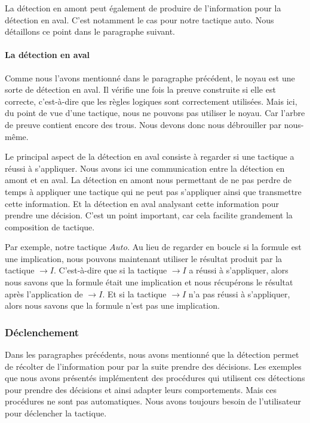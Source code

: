 \documentclass[french,titlepage]{article}
\begin{document}
La détection en amont peut également de produire de l'information pour la détection en aval. C'est notamment le cas pour notre tactique auto. Nous détaillons ce point dans le paragraphe suivant.

\paragraph{La détection en aval}
Comme nous l'avons mentionné dans le paragraphe précédent, le noyau est une sorte de détection en aval. Il vérifie une fois la preuve construite si elle est correcte, c'est-à-dire que les règles logiques sont correctement utilisées. Mais ici, du point de vue d'une tactique, nous ne pouvons pas utiliser le noyau. Car l'arbre de preuve contient encore des trous. Nous devons donc nous débrouiller par nous-même.

Le principal aspect de la détection en aval consiste à regarder si une tactique a réussi à s'appliquer. Nous avons ici une communication entre la détection en amont et en aval. La détection en amont nous permettant de ne pas perdre de temps à appliquer une tactique qui ne peut pas s'appliquer ainsi que transmettre cette information. Et la détection en aval analysant cette information pour prendre une décision. C'est un point important, car cela facilite grandement la composition de tactique.

Par exemple, notre tactique $Auto$. Au lieu de regarder en boucle si la formule est une implication, nous pouvons maintenant utiliser le résultat produit par la tactique $\to I$. C'est-à-dire que si la tactique $\to I$ a réussi à s'appliquer, alors nous savons que la formule était une implication et nous récupérons le résultat après l'application de $\to I$. Et si la tactique $\to I$ n'a pas réussi à s'appliquer, alors nous savons que la formule n'est pas une implication.

\subsubsection{Déclenchement} \label{Declenchement}
Dans les paragraphes précédents, nous avons mentionné que la détection permet de récolter de l'information pour par la suite prendre des décisions. Les exemples que nous avons présentés implémentent des procédures qui utilisent ces détections pour prendre des décisions et ainsi adapter leurs comportements. Mais ces procédures ne sont pas automatiques. Nous avons toujours besoin de l'utilisateur pour déclencher la tactique.
\end{document}

